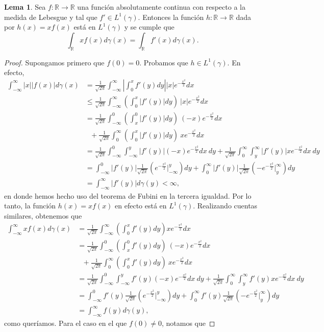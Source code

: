 \documentclass[letterpaper,twoside,12pt]{book}
\newcommand{\R}{\mathbb{R}}
\newcommand{\1}{\mathds{1}}
\newcommand{\abs}[1]{\left\lvert #1 \right\rvert}
\renewcommand{\to}{\rightarrow}
\theoremstyle{definition}
\theoremstyle{definition}
\theoremstyle{definition}
\theoremstyle{definition}
\theoremstyle{definition}
\theoremstyle{definition}
\theoremstyle{definition}
\newtheorem{lema}{Lema}
\begin{document}
\begin{lema}\label{lema1}
 Sea $f:\R\to\R$ una función absolutamente continua con respecto a la medida de Lebesgue y tal que $f'\in L^{1}(\gamma)$. Entonces la función $h:\R\to\R$ dada por $h(x)=xf(x)$ está en $L^1(\gamma)$ y se cumple que 
 \[
 \int_\R xf(x)d\gamma(x)=\int_\R f'(x)d\gamma(x).
 \]
 \end{lema}
\begin{proof} 
   Supongamos primero que $f(0)=0$. Probamos que $h\in L^{1}(\gamma)$. En efecto,  
   \begin{align*}
    \int_{-\infty}^{\infty}|x||f(x)|d\gamma(x)&=\frac{1}{\sqrt{2\pi}}\int_{-\infty}^\infty\abs{\int_0^{x}f'(y)dy}|x|e^{-\frac{x^2}{2}}dx\\
    &\leq \frac{1}{\sqrt{2\pi}}\int_{-\infty}^\infty \left(\int_0^{x}\abs{f'(y)}dy\right) \ |x|e^{-\frac{x^2}{2}}dx\\
    &=\frac{1}{\sqrt{2\pi}}\int_{-\infty}^0 \left(\int_x^{0}\abs{f'(y)}dy\right) \ (-x)e^{-\frac{x^2}{2}}dx\\
    & \ \ \  +\frac{1}{\sqrt{2\pi}}\int_{0}^\infty \left(\int_0^{x}\abs{f'(y)}dy\right) \ xe^{-\frac{x^2}{2}}dx\\
    &=\frac{1}{\sqrt{2\pi}}\int_{-\infty}^0 \int_{-\infty}^{y}\abs{f'(y)}(-x)e^{-\frac{x^2}{2}}dx \ dy+\frac{1}{\sqrt{2\pi}} \int_{0}^{\infty}\int_{y}^\infty \abs{f'(y)}xe^{-\frac{x^2}{2}}dx \ dy\\
    &=\int_{-\infty}^0 \abs{f'(y)}\frac{1}{\sqrt{2\pi}}\left(e^{-\frac{x^2}{2}}\Big|_{-\infty}^{y}\right) dy + \int_{0}^{\infty}\abs{f'(y)}\frac{1}{\sqrt{2\pi}}\left(-e^{-\frac{x^2}{2}}\Big|_{y}^{\infty}\right)dy\\
    &=\int_{-\infty}^{\infty}|f'(y)|d\gamma(y)<\infty,
   \end{align*}
   en donde hemos hecho uso del teorema de Fubini en la tercera igualdad. Por lo tanto, la función $h(x)=xf(x)$ en efecto está en $L^1(\gamma)$. Realizando cuentas similares, obtenemos que 
   \begin{align*}
    \int_{-\infty}^{\infty}xf(x)d\gamma(x)&=\frac{1}{\sqrt{2\pi}}\int_{-\infty}^\infty \left(\int_0^{x}f'(y)dy\right) xe^{-\frac{x^2}{2}}dx\\
    &=\frac{1}{\sqrt{2\pi}}\int_{-\infty}^0 \left(\int_x^{0}f'(y)dy\right) \ (-x)e^{-\frac{x^2}{2}}dx\\
    & \ \ \  +\frac{1}{\sqrt{2\pi}}\int_{0}^\infty \left(\int_0^{x}f'(y) dy\right) \ xe^{-\frac{x^2}{2}}dx\\
    &=\frac{1}{\sqrt{2\pi}}\int_{-\infty}^0 \int_{-\infty}^{y}f'(y)(-x)e^{-\frac{x^2}{2}}dx\ dy+\frac{1}{\sqrt{2\pi}} \int_{0}^{\infty}\int_{y}^\infty f'(y)xe^{-\frac{x^2}{2}}dx\ dy\\
    &=\int_{-\infty}^0 f'(y)\frac{1}{\sqrt{2\pi}}\left(e^{-\frac{x^2}{2}}\Big|_{-\infty}^{y}\right) dy + \int_{0}^{\infty}f'(y)\frac{1}{\sqrt{2\pi}}\left(-e^{-\frac{x^2}{2}}\Big|_{y}^{\infty}\right)dy\\
    &=\int_{-\infty}^{\infty}f(y)d\gamma(y),
   \end{align*}
   como queríamos. Para el caso en el que $f(0)\neq 0$, notamos que 
 \end{proof}
\end{document}
